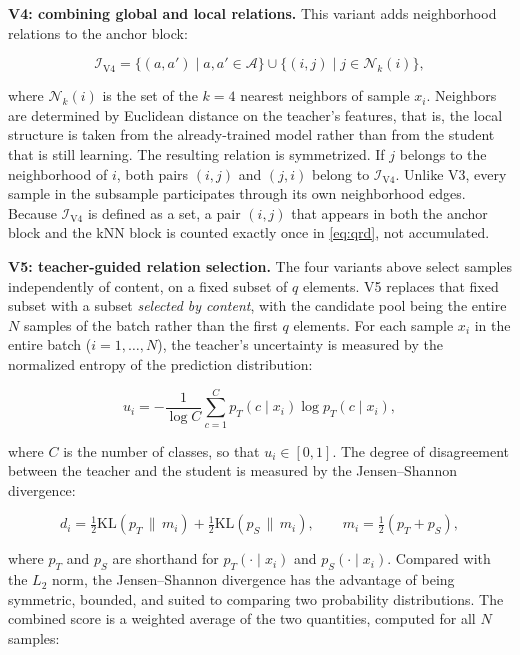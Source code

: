 \textbf{V4: combining global and local relations.} This variant adds
neighborhood relations to the anchor block:

\begin{equation}
\label{eq:i-v4}
\mathcal{I}_{\mathrm{V4}} = \{(a,a') \mid a,a' \in \mathcal{A}\}
  \cup \{(i,j) \mid j \in \mathcal{N}_k(i)\},
\end{equation}

where $\mathcal{N}_k(i)$ is the set of the $k = 4$ nearest neighbors
of sample $x_i$. Neighbors are determined by Euclidean distance on
the teacher's features, that is, the local structure is taken from
the already-trained model rather than from the student that is still
learning. The resulting relation is symmetrized. If $j$ belongs to
the neighborhood of $i$, both pairs $(i,j)$ and $(j,i)$ belong to
$\mathcal{I}_{\mathrm{V4}}$. Unlike V3, every sample in the subsample
participates through its own neighborhood edges. Because
$\mathcal{I}_{\mathrm{V4}}$ is defined as a set, a pair $(i,j)$ that
appears in both the anchor block and the kNN block is counted
exactly once in \eqref{eq:qrd}, not accumulated.

\textbf{V5: teacher-guided relation selection.} The four variants
above select samples independently of content, on a fixed subset of
$q$ elements. V5 replaces that fixed subset with a subset
\emph{selected by content}, with the candidate pool being the entire
$N$ samples of the batch rather than the first $q$ elements. For
each sample $x_i$ in the entire batch ($i = 1,\ldots,N$), the
teacher's uncertainty is measured by the normalized entropy of the
prediction distribution:

\begin{equation}
\label{eq:entropy}
u_i = -\frac{1}{\log C}\sum_{c=1}^{C}
  p_T(c \mid x_i) \log p_T(c \mid x_i),
\end{equation}

where $C$ is the number of classes, so that $u_i \in [0,1]$. The
degree of disagreement between the teacher and the student is
measured by the Jensen--Shannon divergence:

\begin{equation}
\label{eq:js}
d_i = \tfrac{1}{2}\mathrm{KL}\!\left(p_T \,\|\, m_i\right)
    + \tfrac{1}{2}\mathrm{KL}\!\left(p_S \,\|\, m_i\right),
\qquad m_i = \tfrac{1}{2}\left(p_T + p_S\right),
\end{equation}

where $p_T$ and $p_S$ are shorthand for $p_T(\cdot \mid x_i)$ and
$p_S(\cdot \mid x_i)$. Compared with the $L_2$ norm, the
Jensen--Shannon divergence has the advantage of being symmetric,
bounded, and suited to comparing two probability distributions. The
combined score is a weighted average of the two quantities, computed
for all $N$ samples:

